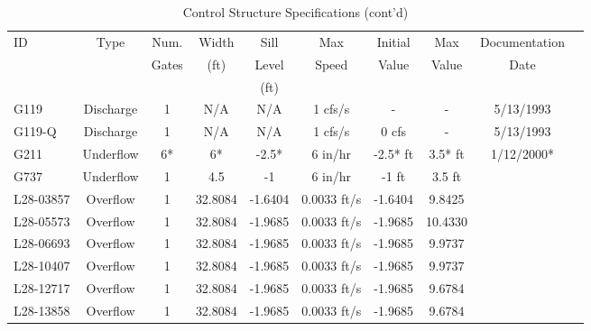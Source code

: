 \scriptsize
\begin{table}[h]
\caption{Control Structure Specifications (cont'd)}
\label{tab:struc-specs2}
\begin{tabular}{@{}lccccccccc@{}}
\toprule
{ID}            & {Type}        & Num.     & Width       & Sill         & Max         & Initial         & Max     & Documentation  \\
                &               & Gates    & (ft)        & Level        & Speed       & Value           & Value   & Date           \\
                &               &          &             & (ft)         &             &                 &         &                \\
\hline
{G119}          & Discharge     & 1        & N/A         & N/A          & 1 cfs/s        & -               & -       & 5/13/1993       \\
{G119-Q}        & Discharge     & 1        & N/A         & N/A          & 1 cfs/s        & 0 cfs           & -       & 5/13/1993       \\
{G211}          & Underflow     & 6*       & 6*          & -2.5*        & 6 in/hr        & -2.5* ft        & 3.5* ft & 1/12/2000*      \\
{G737}          & Underflow     & 1        & 4.5         & -1           & 6 in/hr        & -1 ft           & 3.5 ft  &                 \\
{L28-03857}     & Overflow      & 1        & 32.8084     & -1.6404      & 0.0033 ft/s    & -1.6404         &  9.8425 &                 \\
{L28-05573}     & Overflow      & 1        & 32.8084     & -1.9685      & 0.0033 ft/s    & -1.9685         & 10.4330 &                 \\
{L28-06693}     & Overflow      & 1        & 32.8084     & -1.9685      & 0.0033 ft/s    & -1.9685         &  9.9737 &                 \\
{L28-10407}     & Overflow      & 1        & 32.8084     & -1.9685      & 0.0033 ft/s    & -1.9685         &  9.9737 &                 \\
{L28-12717}     & Overflow      & 1        & 32.8084     & -1.9685      & 0.0033 ft/s    & -1.9685         &  9.6784 &                 \\
{L28-13858}     & Overflow      & 1        & 32.8084     & -1.9685      & 0.0033 ft/s    & -1.9685         &  9.6784 &                 \\

\end{tabular}
\end{table}
